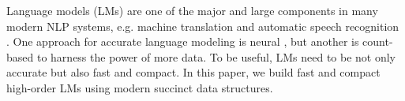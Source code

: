 Language models (LMs) are one of the major and large components in many modern NLP systems, 
e.g. machine translation \cite{koehn2010book} 
and automatic speech recognition \cite{rab93book}.
%
One approach for accurate language modeling is neural 
\cite{Bengio:2003:NPL,DBLP:conf/interspeech/MikolovKBCK10}, but another is  count-based 
\cite{chen1996empirical} to harness the power of more data.
%
%
To be useful, LMs need to be not only accurate but also fast and compact.
%
In this paper, we build  fast and compact high-order \ngram LMs
using modern succinct data structures.

%
%



